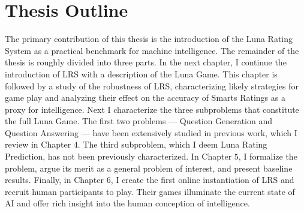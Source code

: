 \section{Thesis Outline}
The primary contribution of this thesis is the introduction of the Luna Rating System as a practical benchmark for machine intelligence. The remainder of the thesis is roughly divided into three parts. In the next chapter, I continue the introduction of LRS with a description of the Luna Game. This chapter is followed by a study of the robustness of LRS, characterizing likely strategies for game play and analyzing their effect on the accuracy of Smarts Ratings as a proxy for intelligence. Next I characterize the three subproblems that constitute the full Luna Game. The first two problems --- Question Generation and Question Answering --- have been extensively studied in previous work, which I review in Chapter $4$. The third subproblem, which I deem Luna Rating Prediction, has not been previously characterized. In Chapter $5$, I formalize the problem, argue its merit as a general problem of interest, and present baseline results. Finally, in Chapter $6$, I create the first online instantiation of LRS and recruit human participants to play. Their games illuminate the current state of AI and offer rich insight into the human conception of intelligence.

